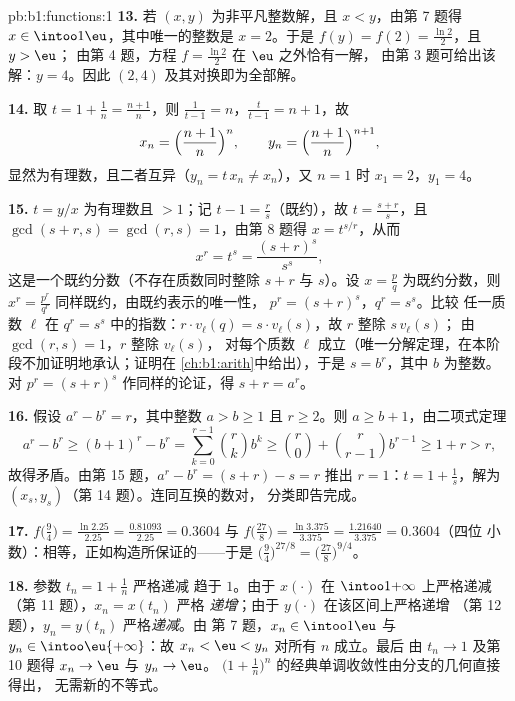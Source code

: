 \begin{solution}{pb:b1:functions:1}
\textbf{13.} 若 $(x, y)$ 为非平凡整数解，且 $x
< y$，由第 7 题得 $x \in \intoo1\eu$，其中唯一的整数是
$x = 2$。于是 $f(y) = f(2) = \frac{\ln2}2$，且 $y > \eu$；
由第 4 题，方程 $f = \frac{\ln2}2$ 在 $\eu$ 之外恰有一解，
由第 3 题可给出该解：$y = 4$。因此
$(2, 4)$ 及其对换即为全部解。

\textbf{14.} 取 $t = 1 + \frac1n = \frac{n+1}n$，则 $\frac1{t - 1}
= n$，$\frac t{t-1} = n + 1$，故
\[
x_n = \Bigl(\frac{n+1}n\Bigr)^{n},
\qquad
y_n = \Bigl(\frac{n+1}n\Bigr)^{n+1},
\]
显然为有理数，且二者互异（$y_n = t\,x_n \neq x_n$），又 $n =
1$ 时 $x_1 = 2$，$y_1 = 4$。

\textbf{15.} $t = y/x$ 为有理数且 $> 1$；记 $t - 1 =
\frac rs$（既约），故 $t = \frac{s + r}s$，且 $\gcd(s +
r, s) = \gcd(r, s) = 1$，由第 8 题得 $x = t^{s/r}$，从而
\[
x^r = t^s = \frac{(s+r)^s}{s^s} ,
\]
这是一个既约分数（不存在质数同时整除 $s + r$ 与
$s$）。设 $x = \frac pq$ 为既约分数，则 $x^r = \frac{p^r}
{q^r}$ 同样既约，由既约表示的唯一性，
$p^r = (s+r)^s$，$q^r = s^s$。比较
任一质数 $\ell$ 在 $q^r = s^s$ 中的指数：$r \cdot
v_\ell(q) = s \cdot v_\ell(s)$，故 $r$ 整除 $s\,v_\ell(s)$；
由 $\gcd(r, s) = 1$，$r$ 整除 $v_\ell(s)$，
对每个质数 $\ell$ 成立（唯一分解定理，在本阶段不加证明地承认；证明在
\cref{ch:b1:arith}中给出），于是 $s = b^r$，其中 $b$ 为整数。对
$p^r = (s+r)^s$ 作同样的论证，得 $s + r = a^r$。

\textbf{16.} 假设 $a^r - b^r = r$，其中整数 $a > b \geq 1$
且 $r \geq 2$。则 $a \geq b + 1$，由二项式定理
\[
a^r - b^r \geq (b+1)^r - b^r
= \sum_{k=0}^{r-1}\binom rk b^k
\geq \binom r0 + \binom r{r-1} b^{r-1}
\geq 1 + r > r ,
\]
故得矛盾。由第 15 题，$a^r - b^r = (s + r) - s = r$
推出 $r = 1$：$t = 1 + \frac1s$，解为 $(x_s,
y_s)$（第 14 题）。连同互换的数对，
分类即告完成。

\textbf{17.} $f\bigl(\tfrac94\bigr) = \frac{\ln 2.25}{2.25} =
\frac{0.81093}{2.25} = 0.3604$ 与 $f\bigl(\tfrac{27}8\bigr) =
\frac{\ln 3.375}{3.375} = \frac{1.21640}{3.375} = 0.3604$（四位
小数）：相等，正如构造所保证的——于是
$\bigl(\tfrac94\bigr)^{27/8} = \bigl(\tfrac{27}8\bigr)^{9/4}$。

\textbf{18.} 参数 $t_n = 1 + \frac1n$ 严格递减
趋于 $1$。由于 $x(\cdot)$ 在
$\intoo1{+\infty}$ 上严格递减（第 11 题），$x_n = x(t_n)$ 严格
\emph{递增}；由于 $y(\cdot)$ 在该区间上严格递增
（第 12 题），$y_n = y(t_n)$ 严格\emph{递减}。由
第 7 题，$x_n \in \intoo1\eu$ 与 $y_n \in
\intoo\eu{+\infty}$：故 $x_n < \eu < y_n$ 对所有 $n$ 成立。最后
由 $t_n \to 1$ 及第 10 题得 $x_n \to \eu$ 与 $y_n \to \eu$。
$\bigl(1 +
\frac1n\bigr)^n$ 的经典单调收敛性由分支的几何直接得出，
无需新的不等式。


\end{solution}
